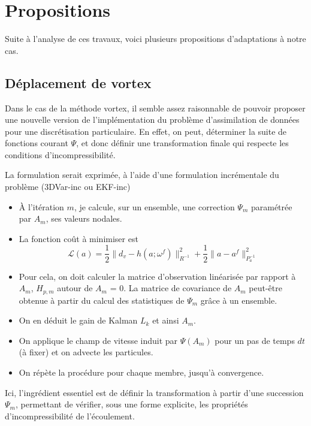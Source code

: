 \documentclass{article}
\begin{document}
\section{Propositions}

Suite à l'analyse de ces travaux, voici plusieurs propositions d'adaptations à notre cas.

\subsection{Déplacement de vortex}
Dans le cas de la méthode vortex, il semble assez raisonnable de pouvoir proposer une nouvelle version de l'implémentation du problème d'assimilation de données pour une discrétisation particulaire.
En effet, on peut, déterminer la suite de fonctions courant $\Psi$, et donc définir une transformation finale qui respecte les conditions d'incompressibilité.

La formulation serait exprimée, à l'aide d'une formulation incrémentale du problème (3DVar-inc ou EKF-inc)


\begin{itemize}
    \item À l'itération $m$, je calcule, sur un ensemble, une correction $\Psi_m$ paramétrée par $A_m$, ses valeurs nodales.
    \item La fonction coût à minimiser est
          \begin{equation*}
              \mathcal{L}(a) = \frac12 \|d_v - h(a; \omega^f)\|^2_{R^{-1}} + \frac12 \|a - a^f\|^2_{P_{a}^{-1}}
          \end{equation*}
    \item Pour cela, on doit calculer la matrice d'observation linéarisée par rapport à $A_m$, $H_{p,m}$ autour de $A_m$ = 0. La matrice de covariance de $A_m$ peut-être obtenue à partir du calcul des statistiques de $\Psi_m$ grâce à un ensemble.
    \item On en déduit le gain de Kalman $L_k$ et ainsi $A_{m}$.
    \item On applique le champ de vitesse induit par $\Psi(A_{m})$ pour un pas de temps $dt$ (à fixer) et on advecte les particules.
    \item On répète la procédure pour chaque membre, jusqu'à convergence.
\end{itemize}


Ici, l'ingrédient essentiel est de définir la transformation à partir d'une succession $\Psi_m$, permettant de vérifier, sous une forme explicite, les propriétés d'incompressibilité de l'écoulement.
\end{document}
